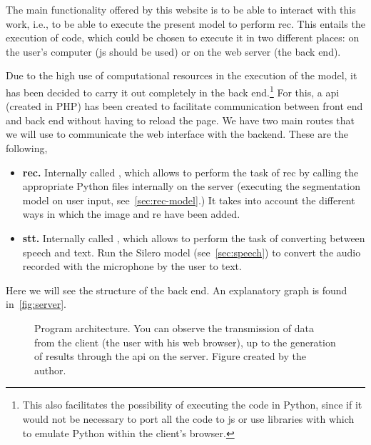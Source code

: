 The main functionality offered by this website is to be able to interact with
this work, i.e., to be able to execute the present model to perform
\gls{rec}. This entails the execution of code, which could be chosen to execute
it in two different places: on the user's computer (\acl{js} should be used) or
on the web server (the back end).

Due to the high use of computational resources in the execution of the model,
it has been decided to carry it out completely in the back end.\footnote{This
  also facilitates the possibility of executing the code in Python, since if it
  would not be necessary to port all the code to \acl{js} or use libraries with
  which to emulate Python within the client's browser.} For this, a \gls{api}
(created in PHP) has been created to facilitate communication between front end
and back end without having to reload the page. We have two main routes that we
will use to communicate the web interface with the backend. These are the
following,
\begin{itemize}
  \item \textbf{\gls{rec}.} Internally called , which
  allows to perform the task of \gls{rec} by calling the appropriate Python
  files internally on the server (executing the segmentation model on user
  input, see\ \vref{sec:rec-model}.) It takes into account the different ways in
  which the image and \gls{re} have been added.
  \item \textbf{\gls{stt}.} Internally called , which allows
  to perform the task of converting between speech and text. Run the Silero
  model (see\ \vref{sec:speech}) to convert the audio recorded with the
  microphone by the user to text.
\end{itemize}

Here we will see the structure of the back end. An explanatory graph is found
in\ \vref{fig:server}.

\begin{figure}[p]
  \centering
  
  \caption[Program architecture]{Program architecture. You can observe the
    transmission of data from the client (the user with his web browser), up to
    the generation of results through the \gls{api} on the server. Figure
    created by the author.}%
  \label{fig:server}
\end{figure}
